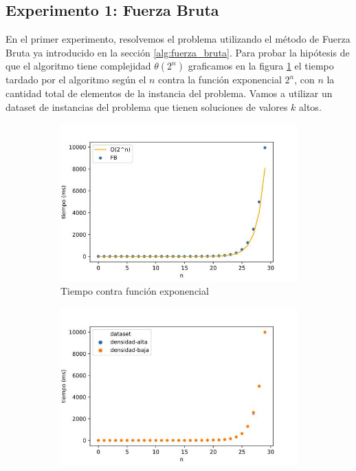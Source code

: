 \documentclass[10pt,a4paper]{article}
\begin{document}
\subsection{Experimento 1: Fuerza Bruta}
En el primer experimento, resolvemos el problema utilizando el método de Fuerza Bruta ya introducido en la sección \ref{alg:fuerza_bruta}. Para probar la hipótesis de que el algoritmo tiene complejidad $\theta(2^{n})$ graficamos en la figura \ref{fig:fb-complejidad} el tiempo tardado por el algoritmo según el $n$ contra la función exponencial $2^{n}$, con $n$ la cantidad total de elementos de la instancia del problema. Vamos a utilizar un dataset de instancias del problema que tienen soluciones de valores $k$ altos.
\newline

\begin{figure}[h!]
	\centering
	\begin{subfigure}{0.4\linewidth}
		\centering
		\includegraphics[scale=0.3]{img/fb-complejidad.jpg}
		\caption{Tiempo contra función exponencial}
		\label{fig:fb-complejidad}
	\end{subfigure}
	\begin{subfigure}{0.4\linewidth}
		\centering
		\includegraphics[scale=0.3]{img/fb-densidades.jpg}

\end{subfigure}
\end{figure}
\end{document}
